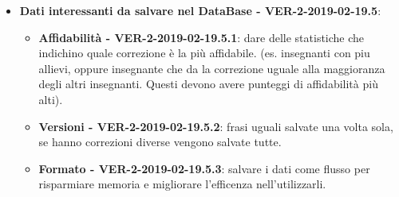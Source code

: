 \documentclass[a4paper, oneside, openany, dvipsnames, table]{article}
\begin{document}
\begin{itemize}
	\item \textbf{Dati interessanti da salvare nel DataBase - VER-2-2019-02-19.5}:
	\begin{itemize}
		\item \textbf{Affidabilità - VER-2-2019-02-19.5.1}: dare delle statistiche che indichino quale correzione è la più affidabile.
		(es. insegnanti con piu allievi, oppure insegnante che da la correzione uguale alla maggioranza degli 
		altri insegnanti. Questi devono avere punteggi di affidabilità più alti). 
		\item \textbf{Versioni - VER-2-2019-02-19.5.2}: frasi uguali salvate una volta sola, se hanno correzioni diverse vengono salvate tutte.
		\item \textbf{Formato - VER-2-2019-02-19.5.3}: salvare i dati come flusso per risparmiare memoria e migliorare l'efficenza nell'utilizzarli.
	\end{itemize}

\end{itemize}
\end{document}
